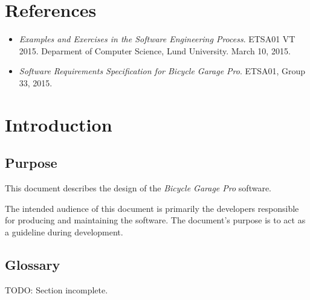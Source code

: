 \documentclass[12pt,titlepage]{article}
\begin{document}


\maketitle
\newpage
\tableofcontents
\thispagestyle{empty}
\setcounter{page}{0}
\newpage


\section{References}
\label{sec:references}

\begin{itemize}
	\item \textit{Examples and Exercises in the Software
		Engineering Process}. ETSA01 VT 2015. Deparment of Computer
		Science, Lund University. March 10, 2015.
	\item \textit{Software Requirements Specification for Bicycle Garage
		Pro}. ETSA01, Group 33, 2015.
\end{itemize}


\section{Introduction}
\label{sec:introduction}

\subsection{Purpose}
\label{subsec:introduction-purpose}

This document describes the design of the \textit{Bicycle Garage Pro} software.

The intended audience of this document is primarily the developers responsible
for producing and maintaining the software. The document's purpose is to act as
a guideline during development.

\subsection{Glossary}
\label{subsec:introduction-glossary}

TODO: Section incomplete. \\
\end{document}
